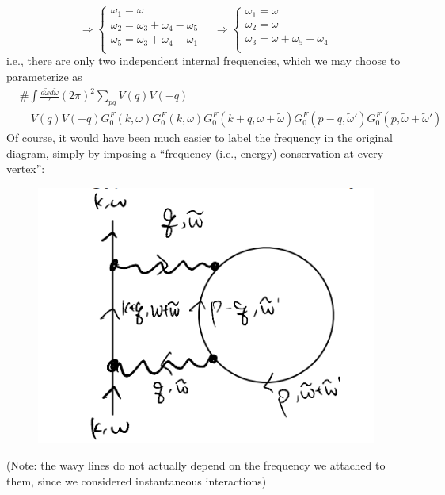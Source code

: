 \[ \Rightarrow \begin{cases}
	\omega _1=\omega\\
	\omega _2=\omega _3+\omega _4-\omega _5\\
	\omega _5=\omega _3+\omega _4-\omega _1\\
\end{cases}\quad \Rightarrow \begin{cases}
	\omega _1=\omega\\
	\omega _2=\omega\\
	\omega _3=\omega +\omega _5-\omega _4\\
\end{cases}\]
i.e., there are only two independent internal frequencies, which we may choose to parameterize as
\begin{align*}
    &\#\int{\frac{d\tilde{\omega}d\tilde{\omega}}'{\left( 2\pi \right) ^2}\sum_{pq}{V\left( q \right) V\left( -q \right)}}\\
    &\quad V\left( q \right) V\left( -q \right) G_{0}^{F}\left( k,\omega \right) G_{0}^{F}\left( k,\omega \right) G_{0}^{F}\left( k+q,\omega +\tilde{\omega} \right) G_{0}^{F}\left( p-q,\tilde{\omega}' \right) G_{0}^{F}\left( p,\tilde{\omega}+\tilde{\omega}' \right)
\end{align*}
Of course, it would have been much easier to label the frequency in the original diagram, simply by imposing a ``frequency (i.e., energy) conservation at every vertex'':
\begin{figure}[H]
    \centering
    \includegraphics{jupyterbook/data/fig/lec18-fig03.png}
\end{figure}
(Note: the wavy lines do not actually depend on the frequency we attached to them, since we considered instantaneous interactions)

